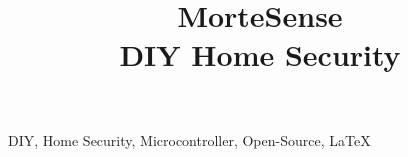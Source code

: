 \documentclass[conference]{IEEEtran}
\begin{document}
    \title{MorteSense \\DIY Home Security}
    
    \maketitle
    
    \begin{IEEEkeywords}
        DIY, Home Security, Microcontroller, Open-Source, \LaTeX
    \end{IEEEkeywords}
    
    
    
    
    
    
    
    
    
\end{document}
